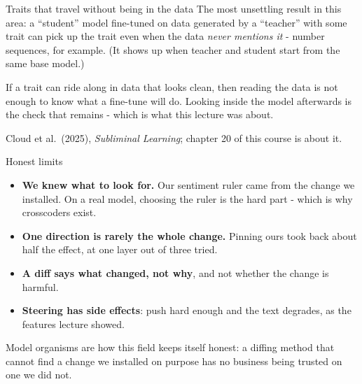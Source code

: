 \documentclass[aspectratio=169]{beamer}
\newcommand{\keybox}[1]{%
  \begin{tcolorbox}[colback=armblue!8, colframe=armblue, boxrule=0.6pt, arc=2pt]
  #1
  \end{tcolorbox}}
\newcommand{\takebox}[1]{%
  \begin{tcolorbox}[colback=paramgreen!8, colframe=paramgreen, boxrule=0.6pt, arc=2pt]
  #1
  \end{tcolorbox}}
\begin{document}
\begin{frame}{Traits that travel without being in the data}
  \vspace{0.6em}
  The most unsettling result in this area: a ``student'' model fine-tuned on data generated by a
  ``teacher'' with some trait can pick up the trait even when the data \emph{never mentions it} -
  number sequences, for example. (It shows up when teacher and student start from the same base
  model.)

  \vspace{0.6em}
  \keybox{\small If a trait can ride along in data that looks clean, then reading the data is not
  enough to know what a fine-tune will do. Looking inside the model afterwards is the check that
  remains - which is what this lecture was about.}

  \vspace{0.3em}
  {\footnotesize Cloud et al.\ (2025), \emph{Subliminal Learning}; chapter 20 of this course is about
  it.}
\end{frame}

\begin{frame}{Honest limits}
  \vspace{0.5em}
  \begin{itemize}
    \item \textbf{We knew what to look for.} Our sentiment ruler came from the change we installed.
      On a real model, choosing the ruler is the hard part - which is why crosscoders exist.
    \item \textbf{One direction is rarely the whole change.} Pinning ours took back about half the
      effect, at one layer out of three tried.
    \item \textbf{A diff says what changed, not why}, and not whether the change is harmful.
    \item \textbf{Steering has side effects}: push hard enough and the text degrades, as the
      features lecture showed.
  \end{itemize}

  \vspace{0.5em}
  \takebox{\small Model organisms are how this field keeps itself honest: a diffing method that
  cannot find a change we installed on purpose has no business being trusted on one we did not.}
\end{frame}
\end{document}
